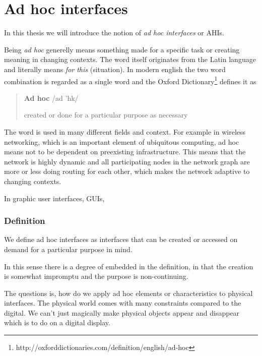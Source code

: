 \section{Ad hoc interfaces}

In this thesis we will introduce the notion of \emph{ad hoc interfaces} or AHIs.

Being \emph{ad hoc} generelly means something made for a specific task or creating meaning in changing contexts.
The word itself originates from the Latin language and literally means \emph{for this} (situation). 
In modern english the two word combination is regarded as a single word and the Oxford Dictionary\footnote{http://oxforddictionaries.com/definition/english/ad-hoc} defines it as

\begin{quotation}
\textbf{Ad hoc}  /ad 'h\textturnscripta k/

created or done for a particular purpose as necessary
\end{quotation}

The word is used in many different fields and context.
For example in wireless networking, which is an important element of ubiquitous computing, ad hoc means not to be dependent on preexisting infrastructure.
This means that the network is highly dynamic and all participating nodes in the network graph are more or less doing routing for each other, which makes the network adaptive to changing contexts.

In graphic user interfaces, GUIs,  



\subsubsection{Definition} 
We define ad hoc interfaces as  interfaces that can be created or accessed on demand for a particular purpose in mind. 

In this sense there is a degree of 	 embedded in the definition, in that the creation is somewhat impromptu and the purpose is non-continuing.

The questions is, how do we apply ad hoc elements or characteristics to physical interfaces.
The physical world comes with many constraints compared to the digital.
We can't just magically make physical objects appear and disappear which is to do on a digital display.


